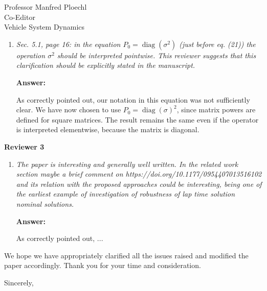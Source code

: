 \documentclass{letter}
\DeclareMathOperator{\diag}{diag}
\begin{document}
\begin{letter}{Professor Manfred Ploechl\\
Co-Editor\\
Vehicle System Dynamics}
\begin{enumerate}
\hrulefill

\item
\textit{Sec. 5.1, page 16: in the equation $P_0=\diag(\sigma^2)$ (just before eq. (21)) the operation $\sigma^2$ should be interpreted pointwise. This reviewer suggests that this clarification should be explicitly stated in the manuscript.}

\vspace{2mm}

\textbf{Answer:}

As correctly pointed out, our notation in this equation was not sufficiently clear. We have now chosen to use $P_0=\diag(\sigma)^2$, since matrix powers are defined for square matrices. The result remains the same even if the operator is interpreted elementwise, because the matrix is diagonal.

\hrulefill

\end{enumerate}

\textbf{Reviewer 3}

\begin{enumerate}

\item
\textit{The paper is interesting and generally well written. In the related work section maybe a brief comment on https://doi.org/10.1177/0954407013516102 and its relation with the proposed approaches could be interesting, being one of the earliest example of investigation of robustness of lap time solution nominal solutions.}

\vspace{2mm}

\textbf{Answer:}

 As correctly pointed out, ... 

\hrulefill
 
\end{enumerate}

We hope we have appropriately clarified all the issues raised and modified the paper accordingly. Thank you for your time and consideration.


\vspace{2\parskip} %
\closing{Sincerely,}
\vspace{2\parskip} %



\end{letter}
\end{document}
